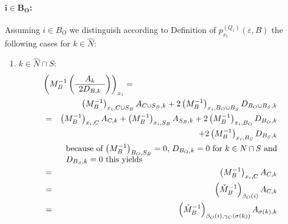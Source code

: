 \documentclass[a4paper]{article}
\begin{document}
\paragraph{$\mathbf{i \in B_{O}}$:}
Assuming $i \in B_{O}$ we distinguish
according to Definition of $p_{x_{i}}^{(Q_{1})}(\varepsilon, B)$
the following cases for $k \in \hat{N}$:
\begin{enumerate}
\item $k \in \hat{N} \cap S$:
\begin{eqnarray}
\label{eq:r1_i_B_O_k_N_S}
\lefteqn{\left(M_{B}^{-1}
           \left(\begin{array}{c}
                   A_{k} \\
	           \hline
	           2D_{B, k}
	         \end{array}
           \right)
         \right)_{x_{i}}
=} \nonumber \\
&&
\left(M_{B}^{-1}\right)_{x_{i}, C \cup S_{B}}A_{C \cup S_{B}, k}
+2\left(M_{B}^{-1}\right)_{x_{i}, B_{O} \cup B_{S}}D_{B_{O} \cup B_{S}, k}
\nonumber \\
&=&
\left(M_{B}^{-1}\right)_{x_{i}, C}A_{C, k}
+\left(M_{B}^{-1}\right)_{x_{i}, S_{B}}A_{S_{B}, k}
+2\left(M_{B}^{-1}\right)_{x_{i}, B_{O}}D_{B_{O}, k}
\nonumber \\
&&
+2\left(M_{B}^{-1}\right)_{x_{i}, B_{S}}D_{B_{S}, k}
\nonumber \\
&&\begin{minipage}{9cm}
because of $\left(M_{B}^{-1}\right)_{B_{O}, S_{B}}=0$, $D_{B_{O}, k}=0$
for $k \in N \cap S$ and $D_{B_{S},k}=0$ this yields 
\end{minipage}
\nonumber \\
&=&
\left(M_{B}^{-1}\right)_{x_{i}, C}A_{C, k}
\nonumber \\
&=&
\left(\check{M}_{B}^{-1}\right)_{\beta_{O}(i)}A_{C, k}
\nonumber \\
&=&
\left(\check{M}_{B}^{-1}\right)_{\beta_{O}(i), \gamma_{C}(\sigma(k))}
  A_{\sigma(k), k}
\end{eqnarray}


\end{enumerate}
\end{document}
